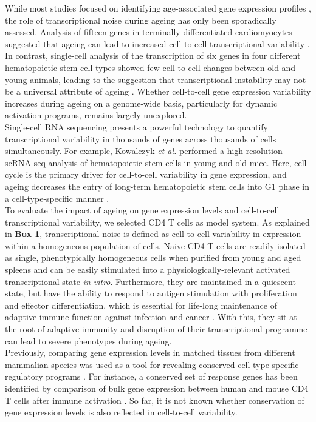 While most studies focused on identifying age-associated gene expression profiles \citep{DeMagalhaes2009}, the role of transcriptional noise during ageing has only been sporadically assessed. Analysis of fifteen genes in terminally differentiated cardiomyocytes suggested that ageing can lead to increased cell-to-cell transcriptional variability \citep{Bahar2006}. In contrast, single-cell analysis of the transcription of six genes in four different hematopoietic stem cell types showed few cell-to-cell changes between old and young animals, leading to the suggestion that transcriptional instability may not be a universal attribute of ageing \citep{Warren2007}. Whether cell-to-cell gene expression variability increases during ageing on a genome-wide basis, particularly for dynamic activation programs, remains largely unexplored.\\

Single-cell RNA sequencing presents a powerful technology to quantify  transcriptional variability in thousands of genes across thousands of cells simultaneously. For example, Kowalczyk \textit{et al.} performed a high-resolution scRNA-seq analysis of hematopoietic stem cells in young and old mice. Here, cell cycle is the primary driver for cell-to-cell variability in gene expression, and ageing decreases the entry of long-term hematopoietic stem cells into G1 phase in a cell-type-specific manner \citep{Kowalczyk2015}.\\ 

To evaluate the impact of ageing on gene expression levels and cell-to-cell transcriptional variability, we selected CD4\plus{} T cells as model system. As explained in \textbf{Box 1}, transcriptional noise is defined as cell-to-cell variability in expression within a homogeneous population of cells. Naive CD4\plus{} T cells are readily isolated as single, phenotypically homogeneous cells when purified from young and aged spleens and can be easily stimulated into a physiologically-relevant activated transcriptional state \emph{in vitro}. Furthermore, they are maintained in a quiescent state, but have the ability to respond to antigen stimulation with proliferation and effector differentiation, which is essential for life-long maintenance of adaptive immune function against infection and cancer \citep{Swain2012, Kim2014a}. With this, they sit at the root of adaptive immunity and disruption of their transcriptional programme can lead to severe phenotypes during ageing. \\

Previously, comparing gene expression levels in matched tissues from different mammalian species was used as a tool for revealing conserved cell-type-specific regulatory programs \citep{Sudmant2015, Finseth2014, Brawand2011, Flajnik2009}. For instance, a conserved set of response genes has been identified by comparison of bulk gene expression between human and mouse CD4\plus{} T cells after immune activation \citep{Shay2013}. So far, it is not known whether conservation of gene expression levels is also reflected in cell-to-cell variability.\\

